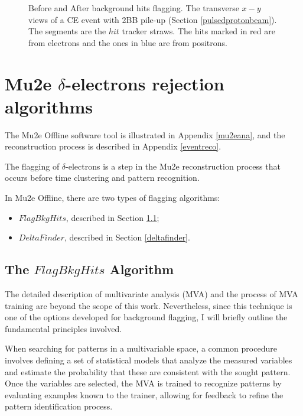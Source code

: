 \begin{figure}[!h]
\begin{subfigure}[b]{0.7\linewidth}
        \label{fig:af}
    \end{subfigure}
    \caption{Before and After background hits flagging. The transverse $x-y$ views of a CE 
    event with 2BB pile-up (Section \ref{pulsedprotonbeam}). The segments are the $hit$ tracker straws. The hits marked in
    red are from electrons and the ones in blue are from positrons.}
    \label{fig:afbef} 
\end{figure}






\section{Mu2e $\delta$-electrons rejection algorithms}
The Mu2e Offline software tool is illustrated in 
Appendix \ref{mu2eana}, and the reconstruction 
process is described in Appendix \ref{eventreco}. 

The flagging of $\delta$-electrons is a step in the 
Mu2e reconstruction process that occurs before time clustering and pattern recognition.

In Mu2e Offline, there are two types of flagging algorithms:
\begin{itemize}
    \item $FlagBkgHits$, described in Section \ref{flagbkghits};
    \item $DeltaFinder$, described in Section \ref{deltafinder}.
\end{itemize}

\subsection{The $FlagBkgHits$ Algorithm}\label{flagbkghits}
The detailed description of multivariate analysis (MVA) and the 
process of MVA training are beyond the scope of this work. 
Nevertheless, since this technique is one of the options 
developed for background flagging, I will briefly outline 
the fundamental principles involved.

When searching for patterns in a multivariable space, 
a common procedure involves defining a set of statistical 
models that analyze the measured variables and estimate 
the probability that these are consistent with the 
sought pattern. Once the variables are selected, 
the MVA is trained to recognize patterns by 
evaluating examples known to the trainer, 
allowing for feedback to refine the 
pattern identification process.

